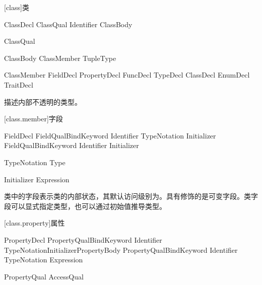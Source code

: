 
[class]{类}

\begin{bnf}{ClassDecl}
    ClassQual\bnfs {} Identifier ClassBody
\end{bnf}

\begin{bnf}{ClassQual}
\end{bnf}

\begin{bnf}{ClassBody}
    \terminal{\{} ClassMember\bnfs \terminal{\}} \br
    TupleType
\end{bnf}

\begin{bnf}{ClassMember}
    FieldDecl \br
    PropertyDecl \br
    FuncDecl \br
    TypeDecl \br
    ClassDecl \br
    EnumDecl \br
    TraitDecl
\end{bnf}

\pnum
{}描述内部不透明的类型。

[class.member]{字段}

\begin{bnf}{FieldDecl}
    FieldQual\bnfs BindKeyword Identifier TypeNotation Initializer\bnfq \terminal{;}
    FieldQual\bnfs BindKeyword Identifier Initializer \terminal{;}
\end{bnf}

\begin{bnf}{TypeNotation}
    \terminal{:} Type
\end{bnf}

\begin{bnf}{Initializer}
    \terminal{=} Expression
\end{bnf}

\pnum
类中的字段表示类的内部状态，其默认访问级别为。具有修饰的是可变字段。类字段可以显式指定类型，也可以通过初始值推导类型。

[class.property]{属性}

\begin{bnf}{PropertyDecl}
    PropertyQual\bnfs BindKeyword Identifier TypeNotation\bnfq Initializer\bnfq PropertyBody \terminal{;} \br
    PropertyQual\bnfs BindKeyword Identifier TypeNotation\bnfq \terminal{=>} Expression \terminal{;}
\end{bnf}

\begin{bnf}{PropertyQual}
    AccessQual
\end{bnf}

